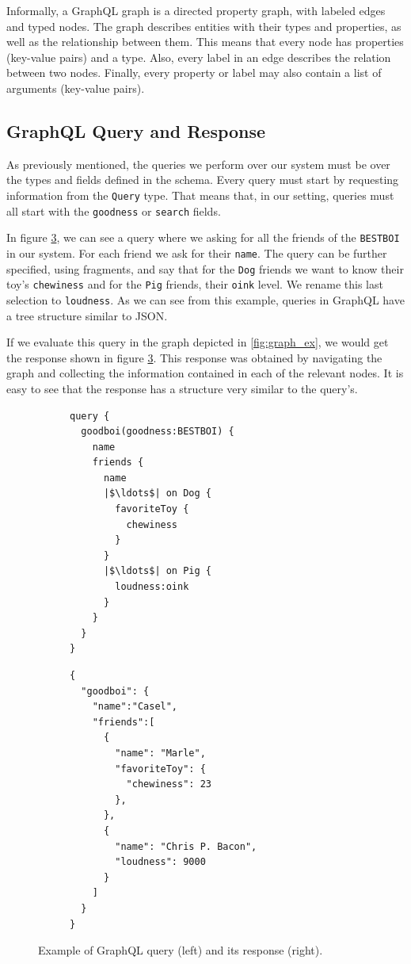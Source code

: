 Informally, a GraphQL graph is a directed property graph, with labeled edges and typed nodes. The graph describes entities with their types and properties, as well as the relationship between them. This means that every node has properties (key-value pairs) and a type. Also, every label in an edge describes the relation between two nodes. Finally, every property or label may also contain a list of arguments (key-value pairs).


\subsection*{GraphQL Query and Response}

As previously mentioned, the queries we perform over our system must be over the types and fields defined in the schema. Every query must start by requesting information from the \texttt{Query} type. That means that, in our setting, queries must all start with the \texttt{goodness} or \texttt{search} fields.

In figure \ref{fig:qres_ex}, we can see a query where we asking for all the friends of the \texttt{BESTBOI} in our system. For each friend we ask for their \texttt{name}. The query can be further specified, using fragments, and say that for the \texttt{Dog} friends we want to know their toy's \texttt{chewiness} and for the \texttt{Pig} friends, their \texttt{oink} level. We rename this last selection to \texttt{loudness}. As we can see from this example, queries in GraphQL have a tree structure similar to JSON.

If we evaluate this query in the graph depicted in \ref{fig:graph_ex}, we would get the response shown in figure \ref{fig:qres_ex}. This response was obtained by navigating the graph and collecting the information contained in each of the relevant nodes. It is easy to see that the response has a structure very similar to the query's.


\begin{figure}
\centering
\begin{subfigure}{.25\textwidth}
\begin{verbatim}
query {
  goodboi(goodness:BESTBOI) {
    name
    friends {
      name
      |$\ldots$| on Dog {
        favoriteToy {
          chewiness
        }
      }
      |$\ldots$| on Pig {
        loudness:oink
      }
    }
  }
}
\end{verbatim}
\label{fig:query_ex}
\end{subfigure}%
\begin{subfigure}{.25\textwidth}
\begin{verbatim}
{
  "goodboi": {
    "name":"Casel",
    "friends":[
      {
        "name": "Marle",
        "favoriteToy": {
          "chewiness": 23
        },
      },
      {
        "name": "Chris P. Bacon",
        "loudness": 9000
      }
    ]
  }
}
\end{verbatim}
\label{fig:response_ex}
\end{subfigure}

\caption{Example of GraphQL query (left) and its response (right).}
\label{fig:qres_ex}
\end{figure}

